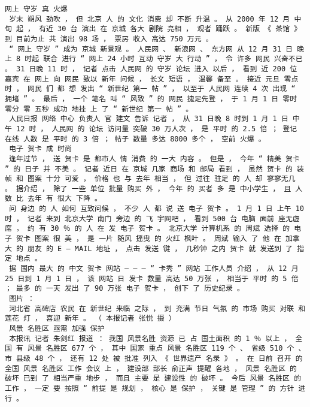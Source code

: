 \documentclass{article}
\begin{document}
\begin{Verbatim}[commandchars=\\\{\}]
 网上 守岁 真 火爆 
 岁末 朔风 劲吹 ， 但 北京 人 的 文化 消费 却 不断 升温 。 从 2000 年 12 月 中旬 起 ， 有近 30 台 演出 在 京城 各大 剧院 亮相 ， 观者 踊跃 。 新版 《 茶馆 》 到 目前为止 共 演出 98 场 ， 票房 收入 高达 750 万元 。 
 “ 网上 守岁 ” 成为 京城 新景观 。 人民网 、 新浪网 、 东方网 从 12 月 31 日 晚上 8 时起 联合 进行 “ 网上 24 小时 互动 守岁 大 行动 ” ， 令 许多 网民 兴奋不已 。 31 日晚 11 时 ， 记者 点击 人民网 的 守岁 论坛 进入 以后 ， 看到 近 200 位 嘉宾 在 网上 向 网民 致以 新年 问候 ， 长文 短语 ， 温馨 备至 。 接近 元旦 零点 时 ， 网民 们 都 想 发出 “ 新世纪 第一 帖 ” ， 以至于 人民网 连续 4 次 出现 “ 拥堵 ” 。 最后 ， 一个 笔名 叫 “ 风致 ” 的 网民 捷足先登 ， 于 1 月 1 日 零时 零分 零 五秒 成功 地挂 上 了 “ 新世纪 第一 帖 ” 。 
 人民日报 网络 中心 负责人 官 建文 告诉 记者 ， 从 31 日晚 8 时到 1 月 1 日 中午 12 时 ， 人民网 的 论坛 访问量 突破 30 万人次 ， 是 平时 的 2.5 倍 ； 登记 在线 人数 是 平时 的 3 倍 ； 帖子 数量 多达 8000 多个 ， 空前 火爆 。 
 电子 贺卡 成 时尚 
 逢年过节 ， 送 贺卡 是 都市人 情 消费 的 一大 内容 。 但是 ， 今年 “ 精美 贺卡 ” 的 日子 并 不美 。 记者 近日 在 京城 几家 商场 和 邮局 看到 ， 虽然 贺卡 的 装帧 和 图案 十分 可爱 ， 价格 也 与 去年 相当 ， 但 过往 驻足 的 人 却 寥寥无几 。 据介绍 ， 除了 一些 单位 批量 购买 外 ， 今年 的 买者 多 是 中小学生 ， 且 人数 比 去年 有 很大 下降 。 
 问 身边 的 人 如何 互致问候 ， 不少 人 都 说 送 电子 贺卡 。 1 月 1 日 上午 10 时 ， 记者 来到 北京大学 南门 旁边 的 飞 宇网吧 ， 看到 500 台 电脑 面前 座无虚席 ， 约 有 30 ％ 的 人 在 发 电子 贺卡 。 北京大学 计算机系 的 周斌 选择 的 电子 贺卡 图案 很 美 ， 是 一片 随风 摇曳 的 火红 枫叶 。 周斌 输入 了 他 在 加拿大 的 朋友 的 E — MAIL 地址 ， 点击 发送 键 ， 几秒钟 之内 贺卡 就 发送到 了 指定 地点 。 
 据 国内 最大 的 中文 贺卡 网站 — — — “ 卡秀 ” 网站 工作人员 介绍 ， 从 12 月 25 日到 1 月 1 日 ， 该 网站 日 发卡 数量 高达 50 万张 ， 相当于 平时 的 5 倍 ； 最多 的 一天 发出 了 90 万张 电子 贺卡 ， 创下 了 历史纪录 。 
 图片 ： 
 河北省 高碑店 农民 在 新世纪 来临 之际 ， 到 充满 节日 气氛 的 市场 购买 对联 和 莲花 灯 ， 喜迎 新年 。 （ 本报记者 张悦 摄 ） 
 风景 名胜区 亟需 加强 保护 
 本报讯 记者 朱剑红 报道 ： 我国 风景名胜 资源 已 占 国土面积 的 1 ％ 以上 ， 全国 有 风景 名胜区 677 个 ， 其中 国家 重点 风景 名胜区 119 个 、 省级 510 个 、 市 县级 48 个 ， 还有 12 处 被 批准 列入 《 世界遗产 名录 》 。 在 日前 召开 的 全国 风景 名胜区 工作 会议 上 ， 建设部 部长 俞正声 提醒 各地 ， 风景 名胜区 的 破坏 已到 了 相当严重 地步 ， 而且 主要 是 建设性 的 破坏 。 今后 风景 名胜区 的 工作 ， 一定 要 按照 “ 前提 是 规划 ， 核心 是 保护 ， 关键 是 管理 ” 的 方针 进行 。 

\end{Verbatim}
\end{document}
